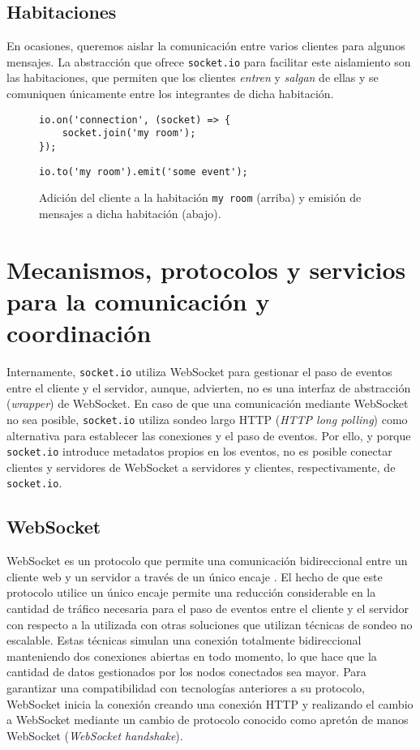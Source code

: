 \documentclass[runningheads]{llncs}
\begin{document}
\subsection{Habitaciones}

En ocasiones, queremos aislar la comunicación entre varios clientes para algunos mensajes.
La abstracción que ofrece \texttt{socket.io} para facilitar este aislamiento son las habitaciones, que permiten que los clientes \textit{entren} y \textit{salgan} de ellas y se comuniquen únicamente entre los integrantes de dicha habitación\cite{room}.

\begin{figure}[!ht]
\begin{lstlisting}
io.on('connection', (socket) => {
	socket.join('my room');
});
\end{lstlisting}
\begin{lstlisting}
io.to('my room').emit('some event');
\end{lstlisting}
\caption{Adición del cliente a la habitación \texttt{my room} (arriba) y emisión de mensajes a dicha habitación (abajo).}
\end{figure}

\section{Mecanismos, protocolos y servicios para la comunicación y coordinación}

Internamente, \texttt{socket.io} utiliza WebSocket para gestionar el paso de eventos entre el cliente y el servidor, aunque, advierten, no es una interfaz de abstracción (\textit{wrapper}) de WebSocket\cite{what-socketio-is-not}.
En caso de que una comunicación mediante WebSocket no sea posible, \texttt{socket.io} utiliza sondeo largo HTTP (\textit{HTTP long polling}) como alternativa para establecer las conexiones y el paso de eventos.
Por ello, y porque \texttt{socket.io} introduce metadatos propios en los eventos, no es posible conectar clientes y servidores de WebSocket a servidores y clientes, respectivamente, de \texttt{socket.io}.

\subsection{WebSocket}

WebSocket es un protocolo que permite una comunicación bidireccional entre un cliente web y un servidor a través de un único encaje \cite{html5-websocket}.
El hecho de que este protocolo utilice un único encaje permite una reducción considerable en la cantidad de tráfico necesaria para el paso de eventos entre el cliente y el servidor con respecto a la utilizada con otras soluciones que utilizan técnicas de sondeo no escalable.
Estas técnicas simulan una conexión totalmente bidireccional manteniendo dos conexiones abiertas en todo momento, lo que hace que la cantidad de datos gestionados por los nodos conectados sea mayor.
Para garantizar una compatibilidad con tecnologías anteriores a su protocolo, WebSocket inicia la conexión creando una conexión HTTP y realizando el cambio a WebSocket mediante un cambio de protocolo conocido como apretón de manos WebSocket (\textit{WebSocket handshake}).
\end{document}
